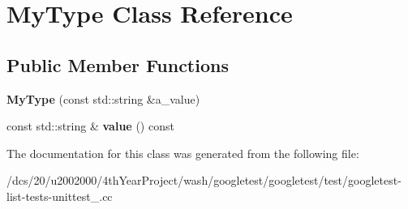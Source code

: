 \hypertarget{classMyType}{}\section{My\+Type Class Reference}
\label{classMyType}
\subsection*{Public Member Functions}
\begin{DoxyCompactItemize}
\item 
\mbox{\label{classMyType_a74d6f29a06e298321a6e5f0b91b020e7}} 
{\bfseries My\+Type} (const std\+::string \&a\+\_\+value)
\item 
\mbox{\label{classMyType_a04eaace57f0ecd8ee8898defbdee31b4}} 
const std\+::string \& {\bfseries value} () const
\end{DoxyCompactItemize}


The documentation for this class was generated from the following file\+:\begin{DoxyCompactItemize}
\item 
/dcs/20/u2002000/4th\+Year\+Project/wash/googletest/googletest/test/googletest-\/list-\/tests-\/unittest\+\_\+.\+cc\end{DoxyCompactItemize}
